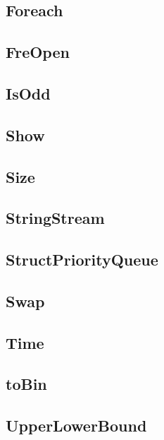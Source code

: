 \subsection{ Foreach}
\raggedbottom
\hrulefill
\subsection{ FreOpen}
\raggedbottom
\hrulefill
\subsection{ IsOdd}
\raggedbottom
\hrulefill
\subsection{ Show}
\raggedbottom
\hrulefill
\subsection{ Size}
\raggedbottom
\hrulefill
\subsection{ StringStream}
\raggedbottom
\hrulefill
\subsection{ StructPriorityQueue}
\raggedbottom
\hrulefill
\subsection{ Swap}
\raggedbottom
\hrulefill
\subsection{ Time}
\raggedbottom
\hrulefill
\subsection{ toBin}
\raggedbottom
\hrulefill
\subsection{ UpperLowerBound}
\raggedbottom
\hrulefill
